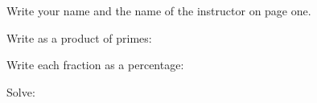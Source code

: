 \documentclass[11pt]{exam}
\begin{document}
\begin{questions}


\addpoints
\question[5] Write your name and the name of the instructor on page one. 

\addpoints
\question Write as a product of primes:

\addpoints
\question Write each fraction as a percentage:

%
%
%
%

\newpage
\addpoints
\question Solve:
\end{questions}
\end{document}
